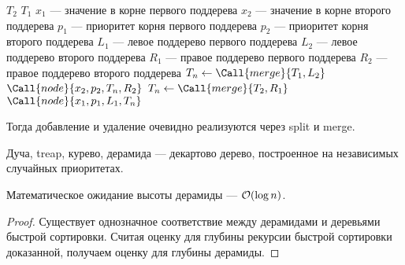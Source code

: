 \noindent
\begin{minipage}{\textwidth}
    \begin{algorithmic}
                \Return $T_2$
            \EndIf
                \Return $T_1$
            \EndIf
            \State $x_1$ --- значение в корне первого поддерева
            \State $x_2$ --- значение в корне второго поддерева
            \State $p_1$ --- приоритет корня первого поддерева
            \State $p_2$ --- приоритет корня второго поддерева
            \State $L_1$ --- левое поддерево первого поддерева
            \State $L_2$ --- левое поддерево второго поддерева
            \State $R_1$ --- правое поддерево первого поддерева
            \State $R_2$ --- правое поддерево второго поддерева
                \State $T_n \gets \Call{merge}{T_1, L_2}$
                \State \Return $\Call{node}{x_2, p_2, T_n, R_2}$
            \Else
                \State $T_n \gets \Call{merge}{T_2, R_1}$
                \State \Return $\Call{node}{x_1, p_1, L_1, T_n}$
            \EndIf
        \EndFunction
    \end{algorithmic}
\end{minipage}

Тогда добавление и удаление очевидно реализуются
через split и merge.

\begin{definition}
    Дуча, treap, курево, дерамида --- декартово дерево,
    построенное на независимых случайных приоритетах.
\end{definition}

\begin{theorem}
    Математическое ожидание высоты дерамиды --- $\mathcal{O}(\log n)$.
\end{theorem}
\begin{proof}
    Существует однозначное соответствие между дерамидами
    и деревьями быстрой сортировки.
    Считая оценку для глубины рекурсии быстрой сортировки доказанной,
    получаем оценку для глубины дерамиды.
\end{proof}
